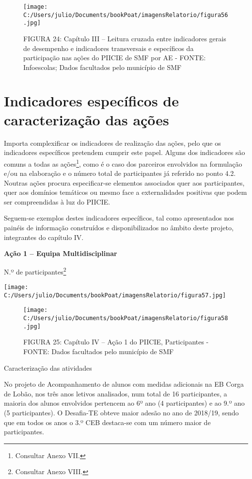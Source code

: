\documentclass[
]{book}
\begin{document}
\begin{figure}
\centering
\texttt{[image: C:/Users/julio/Documents/bookPoat/imagensRelatorio/figura56.jpg]}
\caption{FIGURA 24: Capítulo III -- Leitura cruzada entre indicadores gerais de desempenho e indicadores transversais e específicos da participação nas ações do PIICIE de SMF por AE - FONTE: Infoescolas; Dados facultados pelo município de SMF}
\end{figure}

\hypertarget{indicadores-especuxedficos-de-caracterizauxe7uxe3o-das-auxe7uxf5es}{%
\section{\texorpdfstring{\textbf{Indicadores específicos de caracterização das ações}}{Indicadores específicos de caracterização das ações}}\label{indicadores-especuxedficos-de-caracterizauxe7uxe3o-das-auxe7uxf5es}}

Importa complexificar os indicadores de realização das ações, pelo que os indicadores específicos pretendem cumprir este papel. Alguns dos indicadores são comuns a todas as ações\footnote{Consultar Anexo VII.}, como é o caso dos parceiros envolvidos na formulação e/ou na elaboração e o número total de participantes já referido no ponto 4.2. Noutras ações procura especificar-se elementos associados quer aos participantes, quer aos domínios temáticos ou mesmo face a externalidades positivas que podem ser compreendidas à luz do PIICIE.

Seguem-se exemplos destes indicadores específicos, tal como apresentados nos painéis de informação construídos e disponibilizados no âmbito deste projeto, integrantes do capítulo IV.

\textbf{Ação 1 -- Equipa Multidisciplinar}

N.º de participantes\footnote{Consultar Anexo VIII.}

\texttt{[image: C:/Users/julio/Documents/bookPoat/imagensRelatorio/figura57.jpg]}

\begin{figure}
\centering
\texttt{[image: C:/Users/julio/Documents/bookPoat/imagensRelatorio/figura58.jpg]}
\caption{FIGURA 25: Capítulo IV -- Ação 1 do PIICIE, Participantes - FONTE: Dados facultados pelo município de SMF}
\end{figure}

Caracterização das atividades

No projeto de Acompanhamento de alunos com medidas adicionais na EB Corga de Lobão, nos três anos letivos analisados, num total de 16 participantes, a maioria dos alunos envolvidos pertencem ao 6º ano (4 participantes) e ao 9.º ano (5 participantes). O Desafia-TE obteve maior adesão no ano de 2018/19, sendo que em todos os anos o 3.º CEB destaca-se com um número maior de participantes.
\end{document}

